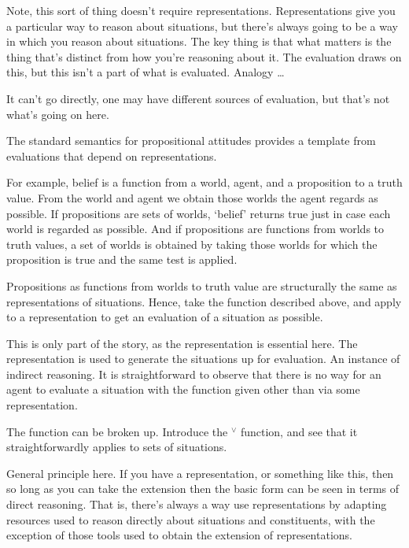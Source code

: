 \documentclass[10pt]{article}
\begin{document}
\newpage




Note, this sort of thing doesn't require representations.
Representations give you a particular way to reason about situations, but there's always going to be a way in which you reason about situations.
The key thing is that what matters is the thing that's distinct from how you're reasoning about it.
The evaluation draws on this, but this isn't a part of what is evaluated.
Analogy \dots 




It can't go directly, one may have different sources of evaluation, but that's not what's going on here.


\newpage


The standard semantics for propositional attitudes provides a template from evaluations that depend on representations.

For example, belief is a function from a world, agent, and a proposition to a truth value.
From the world and agent we obtain those worlds the agent regards as possible.
If propositions are sets of worlds, `belief' returns true just in case each world is regarded as possible.
And if propositions are functions from worlds to truth values, a set of worlds is obtained by taking those worlds for which the proposition is true and the same test is applied.

Propositions as functions from worlds to truth value are structurally the same as representations of situations.
Hence, take the function described above, and apply to a representation to get an evaluation of a situation as possible.

This is only part of the story, as the representation is essential here.
The representation is used to generate the situations up for evaluation.
An instance of indirect reasoning.
It is straightforward to observe that there is no way for an agent to evaluate a situation with the function given other than via some representation.

The function can be broken up.
Introduce the \(^{\lor}\) function, and see that it straightforwardly applies to sets of situations.

General principle here.
If you have a representation, or something like this, then so long as you can take the extension then the basic form can be seen in terms of direct reasoning.
That is, there's always a way use representations by adapting resources used to reason directly about situations and constituents, with the exception of those tools used to obtain the extension of representations.
\end{document}
